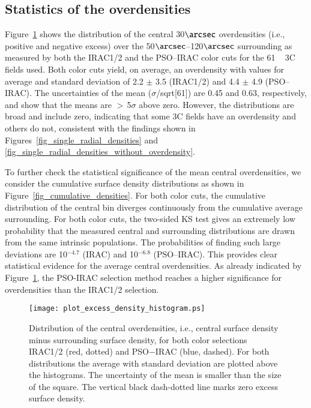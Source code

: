 \documentclass[mathleft,fleqn,%
]{an}
\begin{document}
 
\subsection{Statistics of the overdensities}
\label{sec:statistics}

Figure~\ref{fig_density_histogram} shows the distribution 
of the central 30$\arcsec$ overdensities 
(i.e., positive and negative excess) over the 50$\arcsec$--120$\arcsec$ surrounding 
as measured by both the IRAC1/2 and the PSO--IRAC color
cuts for the 61 ~ 3C fields used.
Both color cuts yield, on average, an overdensity with values for average
and standard deviation of 
2.2 $\pm$ 3.5 (IRAC1/2) and 4.4 $\pm$ 4.9 (PSO--IRAC). 
The uncertainties of the mean ($\sigma$/sqrt[61]) are 0.45 and 0.63,
respectively, and show that the
means are $>$\,5$\sigma$ above zero. 
However, the
distributions are broad and include zero, indicating that 
some 3C fields have an overdensity and others do not, consistent
with the findings shown in Figures~\ref{fig_single_radial_densities} 
and \ref{fig_single_radial_densities_without_overdensity}.

To further check the statistical significance of the mean central
overdensities, we consider the cumulative surface density
distributions as shown in Figure~\ref{fig_cumulative_densities}.
For both color cuts, the cumulative distribution of the central bin
diverges continuously from the cumulative average surrounding. 
For both color cuts, the  two-sided KS test gives an extremely low
probability that the measured central and surrounding 
distributions are drawn from the same intrinsic populations. The
probabilities of finding such large deviations are
10$^{-4.7}$ (IRAC) and 10$^{-6.8}$ (PSO--IRAC).
This provides clear statistical evidence for the average central
overdensities.
As already indicated by 
Figure~\ref{fig_density_histogram}, 
the PSO-IRAC selection method reaches a 
higher significance %
for overdensities than the
IRAC1/2 selection. 


\begin{figure}
  \texttt{[image: plot\_excess\_density\_histogram.ps]}
  \caption{Distribution of the central
    overdensities, i.e., central surface density minus surrounding surface
    density, for both color selections  IRAC1/2 (red, dotted)
    and  PSO$-$IRAC (blue, dashed).
    For both distributions the average with standard
    deviation are plotted above the histograms.
    The uncertainty of the mean is smaller than the size of the square. 
    The vertical black dash-dotted line marks zero excess surface density.
  }
  \label{fig_density_histogram}
\end{figure}
\end{document}
